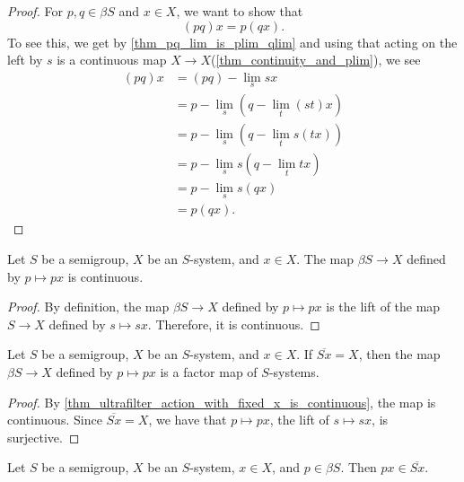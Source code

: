 \begin{proof}
\leanok{}
    For $p, q \in \beta S$ and $x \in X$, we want to show that 
    \[(pq) x = p(qx).\]
    To see this, we get by \cref{thm_pq_lim_is_plim_qlim} and using that acting on the left by $s$ is a continuous map $X \to X$(\cref{thm_continuity_and_plim}), we see
    \begin{align*}
        (pq) x &= (pq)-\lim_s sx\\
        &= p-\lim_s (q-\lim_t (st)x ) \\
        &= p-\lim_s (q-\lim_t s(tx)) \\
        &= p-\lim_s s(q-\lim_t tx) \\
        &= p-\lim_s s (qx) \\
        &= p(qx).
    \end{align*}
\end{proof}

\begin{theorem}
    \label{thm_ultrafilter_action_with_fixed_x_is_continuous}
    \leanok{}
    Let $S$ be a semigroup, $X$ be an $S$-system, and $x \in X$.  The map $\beta S \to X$ defined by $p \mapsto px$ is continuous.
\end{theorem}

\begin{proof}
\leanok{}
    By definition, the map $\beta S \to X$ defined by $p \mapsto px$ is the lift of the map $S \to X$ defined by $s \mapsto sx$.  Therefore, it is continuous.
\end{proof}

\begin{theorem}
    \label{thm_ultra_factor_map}
    \leanok{}
    Let $S$ be a semigroup, $X$ be an $S$-system, and $x \in X$.  If $\overline{Sx} = X$, then the map $\beta S \to X$ defined by $p \mapsto px$ is a factor map of $S$-systems.
\end{theorem}

\begin{proof}
\leanok{}
    By \cref{thm_ultrafilter_action_with_fixed_x_is_continuous}, the map is continuous.  Since $\overline{Sx} = X$, we have that $p \mapsto px$, the lift of $s \mapsto sx$, is surjective.
\end{proof}

\begin{theorem}
    \label{thm_ultra_point_in_orb_closure}
    \leanok{}
    Let $S$ be a semigroup, $X$ be an $S$-system, $x \in X$, and $p \in \beta S$. Then $px \in \overline{Sx}$.
\end{theorem}

